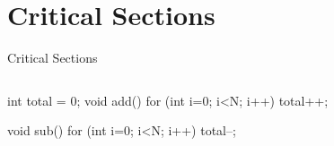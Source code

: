 \documentclass[11pt,aspectratio=169]{beamer}
\begin{document}

\section{Critical Sections}

\begin{slide}{Critical Sections}
\begin{columns}
    \begin{ccode}
int total = 0;
void add() {
    for (int i=0; i<N; i++) {
	total++;
    }
}

void sub() {
    for (int i=0; i<N; i++) {
	total--;
    }
}
    \end{ccode}
\end{columns}
\end{slide}
\end{document}
